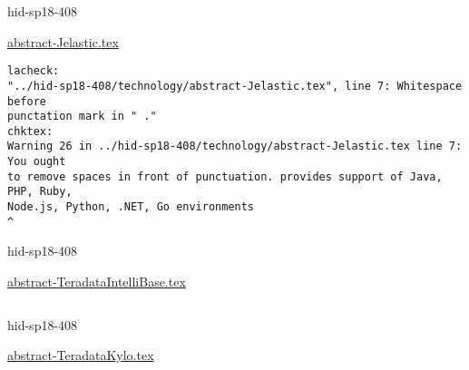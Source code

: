 

\begin{IU}

hid-sp18-408

\href{https://github.com/cloudmesh-community/hid-sp18-408/blob/master//technology/abstract-Jelastic.tex}{abstract-Jelastic.tex}

\begin{tiny}
\begin{verbatim}
lacheck:
"../hid-sp18-408/technology/abstract-Jelastic.tex", line 7: Whitespace before
punctation mark in " ."
chktex:
Warning 26 in ../hid-sp18-408/technology/abstract-Jelastic.tex line 7: You ought
to remove spaces in front of punctuation. provides support of Java, PHP, Ruby,
Node.js, Python, .NET, Go environments
^
\end{verbatim}
\end{tiny}
\end{IU}



\begin{IU}

hid-sp18-408

\href{https://github.com/cloudmesh-community/hid-sp18-408/blob/master//technology/abstract-TeradataIntelliBase.tex}{abstract-TeradataIntelliBase.tex}

\begin{tiny}
\begin{verbatim}
\end{verbatim}
\end{tiny}
\end{IU}



\begin{IU}

hid-sp18-408

\href{https://github.com/cloudmesh-community/hid-sp18-408/blob/master//technology/abstract-TeradataKylo.tex}{abstract-TeradataKylo.tex}

\begin{tiny}
\begin{verbatim}
\end{verbatim}
\end{tiny}
\end{IU}



